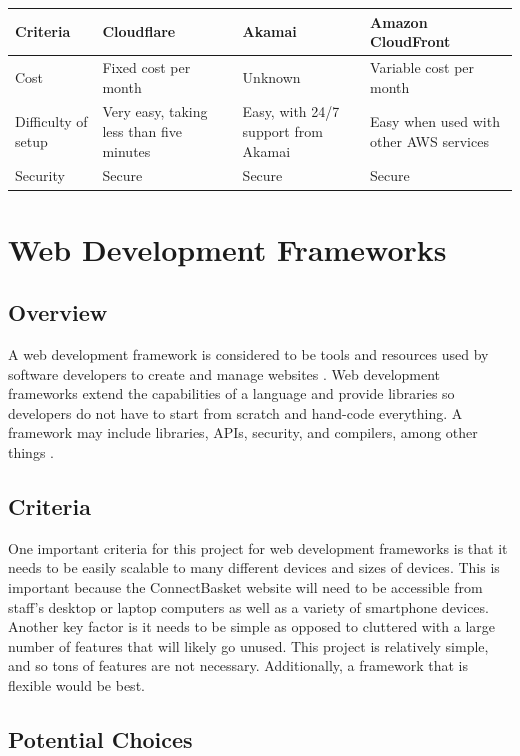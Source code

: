 \documentclass[onecolumn, draftclsnofoot,10pt, compsoc]{IEEEtran}
\begin{document}
\begin{table}[h!]
\centering
\begin{tabular}{ |p{.2\linewidth}|p{.2\linewidth}|p{.2\linewidth}|p{.2\linewidth}| } 
\hline
\textbf{Criteria} & \textbf{Cloudflare} & \textbf{Akamai} & \textbf{Amazon CloudFront} \\ \hline
Cost & Fixed cost per month & Unknown & Variable cost per month \\ \hline
Difficulty of setup & Very easy, taking less than five minutes & Easy, with 24/7 support from Akamai & Easy when used with other AWS services\\ \hline
Security & Secure & Secure & Secure \\ \hline
\end{tabular}
\end{table}


\section{Web Development Frameworks}

\subsection{Overview}
A web development framework is considered to be tools and resources used by software developers to create and manage websites \cite{webdevframework}. Web development frameworks extend the capabilities of a language and provide libraries so developers do not have to start from scratch and hand-code everything. A framework may include libraries, APIs, security, and compilers, among other things \cite{framework}.

\subsection{Criteria}
One important criteria for this project for web development frameworks is that it needs to be easily scalable to many different devices and sizes of devices. This is important because the ConnectBasket website will need to be accessible from staff's desktop or laptop computers as well as a variety of smartphone devices. Another key factor is it needs to be simple as opposed to cluttered with a large number of features that will likely go unused. This project is relatively simple, and so tons of features are not necessary. Additionally, a framework that is flexible would be best. 

\subsection{Potential Choices}
\end{document}
